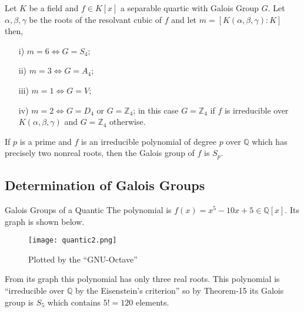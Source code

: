 \documentclass{beamer}
\begin{document}
\begin{frame}
  \begin{tcolorbox}
\begin{theorem}[Theorem]
  Let \(K\) be a field and \(f \in K[x]\) a separable quartic with Galois Group \(G\). Let \(\alpha, \beta, \gamma\) be the roots of the resolvant cubic of \(f\) and let \(m= [K(\alpha, \beta, \gamma) : K]\) then,
\begin{enumerate}
\item[i)] \(m=6 \Longleftrightarrow G=S_4\);
\item[ii)] \(m=3 \Longleftrightarrow G=A_4\);
\item[iii)] \(m=1 \Longleftrightarrow G=V\);
\item[iv)] \(m=2 \Longleftrightarrow G=D_4\) or \(G={\mathbb{Z}}_4\); in this case \(G={\mathbb{Z}}_4\) if \(f\) is irreducible over \(K(\alpha, \beta, \gamma)\) and \(G={\mathbb{Z}}_4\) otherwise\cite{hunger}.
\end{enumerate}
\end{theorem}
\end{tcolorbox}

\begin{theorem}[Theorem]
If \(p\) is a prime and \(f\) is an irreducible polynomial of degree \(p\) over \(\mathbb{Q}\) which has precisely two nonreal roots, then the Galois group of \(f\) is \(S_p\)\cite{hunger}.
\end{theorem}
\end{frame}

\subsection{Determination of Galois Groups}
\begin{frame}{Galois Groups of a Quantic}
  The polynomial is \(f(x)=x^5-10x+5 \in \mathbb{Q}[x]\). Its graph is shown below.
  \begin{figure}[h!]
    \texttt{[image: quantic2.png]}
    \caption{\footnotesize Plotted by the ``GNU-Octave''}
  \end{figure}

 From its graph this polynomial has only three real roots. This polynomial is ``irreducible over \(\mathbb{Q}\) by the Eisenstein's criterion'' \cite{hunger} so by Theorem-15 its Galois group is \(S_5\) which contains \(5!=120\) elements.
\end{frame}
\end{document}
